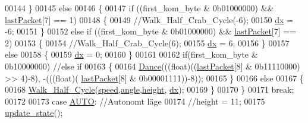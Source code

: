 \begin{DoxyCode}
00144             \}
00145             \textcolor{keywordflow}{else}
00146             \{
00147                 \textcolor{keywordflow}{if} ((first\_kom\_byte & 0b01000000) && \hyperlink{styr_2styr_2main_8c_a17b197a501fde4cc8d5475b4adaab464}{lastPacket}[7] == 1)
00148                 \{
00149                     \textcolor{comment}{//Walk\_Half\_Crab\_Cycle(-6);}
00150                     \hyperlink{styr_2styr_2main_8c_a6b061c378131aa307e80484d3165a27c}{dx} = -6;
00151                 \}
00152                 \textcolor{keywordflow}{else} \textcolor{keywordflow}{if} ((first\_kom\_byte & 0b01000000) && \hyperlink{styr_2styr_2main_8c_a17b197a501fde4cc8d5475b4adaab464}{lastPacket}[7] == 2)
00153                 \{
00154                     \textcolor{comment}{//Walk\_Half\_Crab\_Cycle(6);}
00155                     \hyperlink{styr_2styr_2main_8c_a6b061c378131aa307e80484d3165a27c}{dx} = 6;
00156                 \}
00157                 \textcolor{keywordflow}{else}
00158                 \{
00159                     \hyperlink{styr_2styr_2main_8c_a6b061c378131aa307e80484d3165a27c}{dx} = 0;
00160                 \}
00161                 
00162                 \textcolor{keywordflow}{if}(first\_kom\_byte & 0b10000000) \textcolor{comment}{//else if}
00163                 \{
00164                     \hyperlink{gangstilar_8c_a52ff26f8e5f26305582c67be8be4417b}{Dance}(((\textcolor{keywordtype}{float})((\hyperlink{styr_2styr_2main_8c_a17b197a501fde4cc8d5475b4adaab464}{lastPacket}[8] & 0b11110000) >> 4)-8), -(((\textcolor{keywordtype}{float})(
      \hyperlink{styr_2styr_2main_8c_a17b197a501fde4cc8d5475b4adaab464}{lastPacket}[8] & 0b00001111))-8));
00165                 \}
00166                 \textcolor{keywordflow}{else}
00167                 \{
00168                     \hyperlink{gangstilar_8c_a8b22e9229a15d20adb676428ad7f6dac}{Walk\_Half\_Cycle}(\hyperlink{styr_2styr_2main_8c_a7f7e4724cf57d59513b39c5ecc81adc8}{speed},\hyperlink{styr_2styr_2main_8c_ab8ef1bf8a70cc07c6d55823c390a7e76}{angle},\hyperlink{styr_2styr_2main_8c_a48083b65ac9a863566dc3e3fff09a5b4}{height},
      \hyperlink{styr_2styr_2main_8c_a6b061c378131aa307e80484d3165a27c}{dx});
00169                 \}
00170             \}
00171             \textcolor{keywordflow}{break};
00172             
00173             \textcolor{keywordflow}{case} \hyperlink{styr_2styr_2main_8c_aeb6c30b72b6dd0937e2d45de44322a49aeef9468d1b98bca652a04bf5063fd9d6}{AUTO}: \textcolor{comment}{//Autonomt läge}
00174             \textcolor{comment}{//height = 11;}
00175             \hyperlink{state__machine_8c_af7c798149db27b6d271bf5845a489513}{update\_state}();

\end{DoxyCode}
